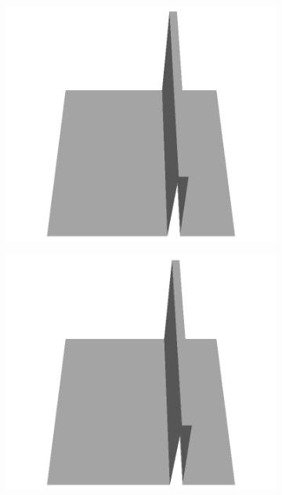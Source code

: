 \documentclass[../document.tex]{subfiles}
\begin{document}
\begin{figure}[H]
\begin{subfigure}[b]{0.065\textwidth}
    \includegraphics[width=\linewidth]{../img/5/custom_patches/walls_front/all/45-3d.png}
    \end{subfigure}
    \begin{subfigure}[b]{0.065\textwidth}
    \includegraphics[width=\linewidth]{../img/5/custom_patches/walls_front/all/44-3d.png}
    \end{subfigure}
    \begin{subfigure}[b]{0.065\textwidth}

\end{subfigure}
\end{figure}
\end{document}
